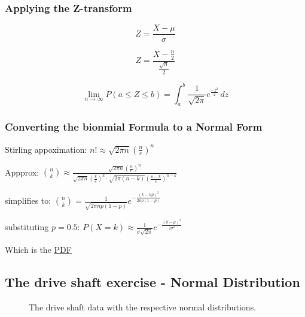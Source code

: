 \documentclass[
  a4paper,
]{scrbook}
\begin{document}
\subsubsection{Applying the Z-transform}\label{applying-the-z-transform}

\[Z = \frac{X-\mu}{\sigma}\]

\[Z = \frac{X-\frac{n}{2}}{\frac{\sqrt{n}}{2}}\]

\[\lim_{n\to\infty} P(a\leq Z \leq b)= \int_a^b \frac{1}{\sqrt{2\pi}}e^\frac{-z^2}{2} \,dz \]

\subsubsection{Converting the bionmial Formula to a Normal
Form}\label{converting-the-bionmial-formula-to-a-normal-form}

Stirling appoximation:
\(n!\approx\sqrt{2\pi n} \left( \frac{n}{e} \right)^n\)

Appprox:
\(\binom{n}{k} \approx \frac{\sqrt{2\pi n} \left( \frac{n}{e} \right)^n}{\sqrt{2\pi n} \left( \frac{k}{e} \right)^k \cdot \sqrt{2\pi(n-k)} \left( \frac{n-k}{e} \right)^{n-k}}\)

simplifies to:
\(\binom{n}{k} = \frac{1}{\sqrt{2\pi n p (1-p)}}e^{-\frac{(k-np)^2}{2np(1-p)}}\)

substituting \(p=0.5\):
\(P(X = k) \approx \frac{1}{\sigma\sqrt{2\pi}}e^{-\frac{(k-\mu)^2}{2\sigma^2}}\)

Which is the \hyperref[acronyms_PDF]{PDF}

\subsection{The drive shaft exercise - Normal
Distribution}\label{the-drive-shaft-exercise---normal-distribution}

\begin{figure}[ht]


\caption{\label{fig-ds-nd}The drive shaft data with the respective
normal distributions.}

\end{figure}%
\end{document}
